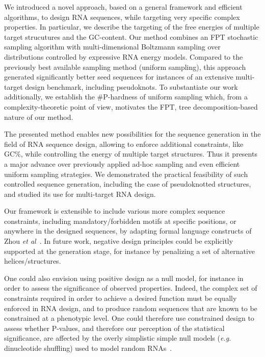\documentclass[]{bmcart}
\newcommand{\Nuc}[1]{{\sf #1}}
\newcommand{\Cb}{\Nuc{C}}
\newcommand{\Gb}{\Nuc{G}}
\newcommand{\GCb}{\Gb\Cb}
\newcommand{\citet}[1]{\cite{#1}}
\begin{document}
We introduced a novel approach, based on a general framework and efficient algorithms, to design RNA
sequences, while targeting very specific complex properties. In particular, we describe the targeting of the free energies of multiple target strucutures and the \GCb-content.
Our method combines an FPT stochastic sampling algorithm
with multi-dimensional Boltzmann sampling over distributions
controlled by expressive RNA energy models. Compared to the
previously best available sampling method (uniform sampling), this
approach generated significantly better seed sequences for instances
of an extensive multi-target design benchmark, including pseudoknots.
%
To substantiate our work additionally, we establish the $\#${\sf P}-hardness of uniform sampling which,
from a complexity-theoretic point of view, motivates the FPT, tree decomposition-based nature of our method.  

The presented method enables new possibilities for the sequence generation
in the field of RNA sequence design, allowing to enforce additional
constraints, like \GCb\%, while controlling the energy of
multiple target structures. Thus it presents a major advance over
previously applied ad-hoc sampling and even efficient uniform sampling
strategies. We demonstrated the practical feasibility of such controlled sequence
generation, including the case of pseudoknotted structures, and studied its use for multi-target RNA design.

Our framework is extensible to include various more complex sequence constraints, including mandatory/forbidden motifs at specific
positions, or anywhere in the designed sequences, by adapting formal language constructs
of Zhou \emph{et al}~\citet{Zhou2013}. In future work, negative design principles could 
be explicitly supported at the generation stage, for instance by
penalizing a set of alternative helices/structures.

One could also envision using positive design as a null model, for instance in order to assess the significance of observed properties. Indeed, the complex set of constraints required in order to achieve a desired function must be equally enforced in RNA design, and to produce random sequences that are known to be constrained at a phenotypic level. One could therefore use constrained design to assess whether P-values, and therefore our perception of the statistical significance, are affected by the overly simplistic simple null models (\emph{e.g.} dinucleotide shuffling) used to model random RNAs~\cite{Rivas2017}.
\end{document}
